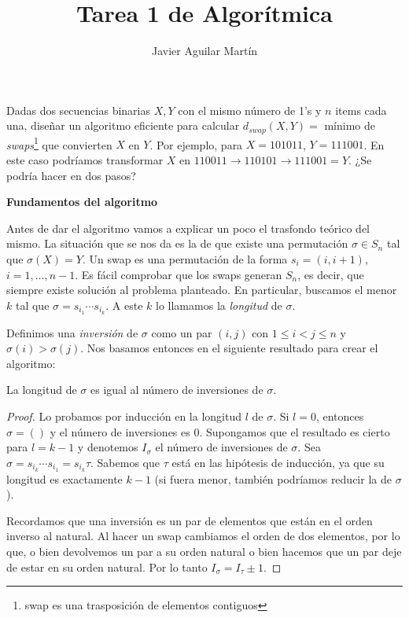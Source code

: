 \documentclass[twoside]{article}
\begin{document}
\title{Tarea 1 de Algorítmica}
\author{Javier Aguilar Martín}
\maketitle


\begin{ejercicio}{1}
Dadas dos secuencias binarias $X,Y$ con el mismo número de 1's y $n$ items cada una, diseñar un algoritmo eficiente para calcular $d_{swap}(X,Y)=$ mínimo de \emph{swaps}\footnote{swap es una trasposición de elementos contiguos} que convierten $X$ en $Y$. Por ejemplo, para $X=101011$, $Y=111001$. En este caso podríamos transformar $X$ en $110011\to 110101\to 111001=Y$. ¿Se podría hacer en dos pasos?
\end{ejercicio}
\begin{solucion}

\textbf{Fundamentos del algoritmo}

Antes de dar el algoritmo vamos a explicar un poco el trasfondo teórico del mismo. La situación que se nos da es la de que existe una permutación $\sigma\in S_n$ tal que $\sigma(X)=Y$. Un swap es una permutación de la forma $s_i=(i, i+1)$, $i=1,\dots, n-1$. Es fácil comprobar que los swaps generan $S_n$, es decir, que siempre existe solución al problema planteado. En particular, buscamos el menor $k$ tal que $\sigma=s_{i_1}\cdots s_{i_k}$. A este $k$ lo llamamos la \emph{longitud} de $\sigma$. 

Definimos una \emph{inversión} de $\sigma$ como un par $(i,j)$ con $1\leq i<j\leq n$ y $\sigma(i)>\sigma(j)$. Nos basamos entonces en el siguiente resultado para crear el algoritmo:

\begin{lemma}
La longitud de $\sigma$ es igual al número de inversiones de $\sigma$. 
\end{lemma}
\begin{proof}
Lo probamos por inducción en la longitud $l$ de $\sigma$. Si $l=0$, entonces $\sigma=()$ y el número de inversiones es 0. Supongamos que el resultado es cierto para $l=k-1$ y denotemos $I_{\sigma}$ el número de inversiones de $\sigma$. Sea $\sigma=s_{i_k}\cdots s_{i_1}=s_{i_k}\tau$. Sabemos que $\tau$ está en las hipótesis de inducción, ya que su longitud es exactamente $k-1$ (si fuera menor, también podríamos reducir la de $\sigma$). 

Recordamos que una inversión es un par de elementos que están en el orden inverso al natural. Al hacer un swap cambiamos el orden de dos elementos, por lo que, o bien devolvemos un par a su orden natural o bien hacemos que un par deje de estar en su orden natural. Por lo tanto $I_{\sigma}=I_{\tau}\pm 1$. 


\end{proof}
\end{solucion}
\end{document}
